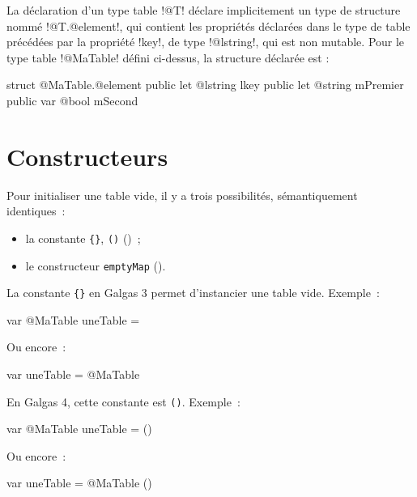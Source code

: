 La déclaration d'un type table \ggsq!@T! déclare implicitement un type de structure nommé \ggsq!@T.@element!, qui contient les propriétés déclarées dans le type de table précédées par la propriété \ggsq!key!, de type \ggsq!@lstring!, qui est non mutable. Pour le type table \ggsq!@MaTable! défini ci-dessus, la structure déclarée est :
 
\begin{galgas4}
struct @MaTable.@element {
  public let @lstring lkey
  public let @string mPremier
  public var @bool mSecond
}
\end{galgas4}





\section{Constructeurs}

Pour initialiser une table vide, il y a trois possibilités, sémantiquement identiques~:
\begin{itemize}
  \item la constante \texttt{\{\}}, \texttt{()} ()~;
  \item le constructeur \texttt{emptyMap} ().
\end{itemize}



La constante \texttt{\{\}} en Galgas 3 permet d'instancier une table vide. Exemple~:
\begin{galgas3}
var @MaTable uneTable = {}
\end{galgas3}

Ou encore~:

\begin{galgas3}
var uneTable = @MaTable {}
\end{galgas3}

En Galgas 4, cette constante est \texttt{()}. Exemple~:
\begin{galgas4}
var @MaTable uneTable = ()
\end{galgas4}

Ou encore~:

\begin{galgas4}
var uneTable = @MaTable ()
\end{galgas4}





